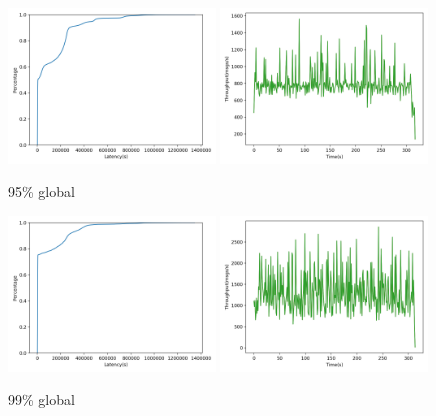 \begin{figure}[!htb]
  \centering
  \includegraphics[width=0.49\textwidth,height=\textheight,keepaspectratio]{img/global5_lat.png}
  \includegraphics[width=0.49\textwidth,height=\textheight,keepaspectratio]{img/global5_tp.png}
  \caption{ 95\% global }
  \label{fig:global5-performance}
\end{figure}

\begin{figure}[!htb]
  \centering
  \includegraphics[width=0.49\textwidth,height=\textheight,keepaspectratio]{img/global1_lat.png}
  \includegraphics[width=0.49\textwidth,height=\textheight,keepaspectratio]{img/global1_tp.png}
  \caption{ 99\% global }
  \label{fig:global1-performance}
\end{figure}

